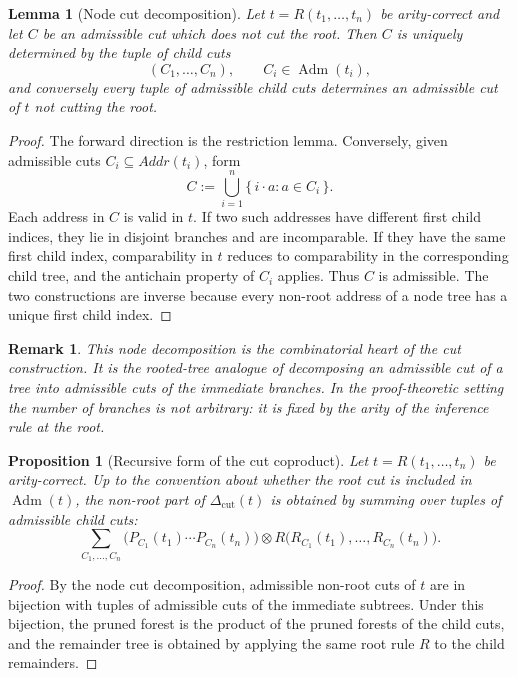 \documentclass[11pt]{article}
\newtheorem{proposition}[theorem]{Proposition}
\newtheorem{lemma}[theorem]{Lemma}
\newtheorem{remark}[theorem]{Remark}
\newcommand{\Addr}{\mathit{Addr}}
\begin{document}
\begin{lemma}[Node cut decomposition]
Let \(t=R(t_1,\ldots,t_n)\) be arity-correct and let \(C\) be an admissible cut
which does not cut the root. Then \(C\) is uniquely determined by the tuple of
child cuts
\[
(C_1,\ldots,C_n),
\qquad C_i\in\operatorname{Adm}(t_i),
\]
and conversely every tuple of admissible child cuts determines an admissible
cut of \(t\) not cutting the root.
\end{lemma}

\begin{proof}
The forward direction is the restriction lemma. Conversely, given admissible
cuts \(C_i\subseteq\Addr(t_i)\), form
\[
C:=\bigcup_{i=1}^n \{\,i\cdot a:a\in C_i\,\}.
\]
Each address in \(C\) is valid in \(t\). If two such addresses have different
first child indices, they lie in disjoint branches and are incomparable. If
they have the same first child index, comparability in \(t\) reduces to
comparability in the corresponding child tree, and the antichain property of
\(C_i\) applies. Thus \(C\) is admissible. The two constructions are inverse
because every non-root address of a node tree has a unique first child index.
\end{proof}

\begin{remark}
This node decomposition is the combinatorial heart of the cut construction.
It is the rooted-tree analogue of decomposing an admissible cut of a tree into
admissible cuts of the immediate branches. In the proof-theoretic setting the
number of branches is not arbitrary: it is fixed by the arity of the inference
rule at the root.
\end{remark}

\begin{proposition}[Recursive form of the cut coproduct]
Let \(t=R(t_1,\ldots,t_n)\) be arity-correct. Up to the convention about
whether the root cut is included in \(\operatorname{Adm}(t)\), the non-root
part of \(\Delta_{\mathrm{cut}}(t)\) is obtained by summing over tuples of
admissible child cuts:
\[
\sum_{C_1,\ldots,C_n}
\bigl(P_{C_1}(t_1)\cdots P_{C_n}(t_n)\bigr)
\otimes
R\bigl(R_{C_1}(t_1),\ldots,R_{C_n}(t_n)\bigr).
\]
\end{proposition}

\begin{proof}
By the node cut decomposition, admissible non-root cuts of \(t\) are in
bijection with tuples of admissible cuts of the immediate subtrees. Under this
bijection, the pruned forest is the product of the pruned forests of the child
cuts, and the remainder tree is obtained by applying the same root rule \(R\)
to the child remainders.
\end{proof}
\end{document}
